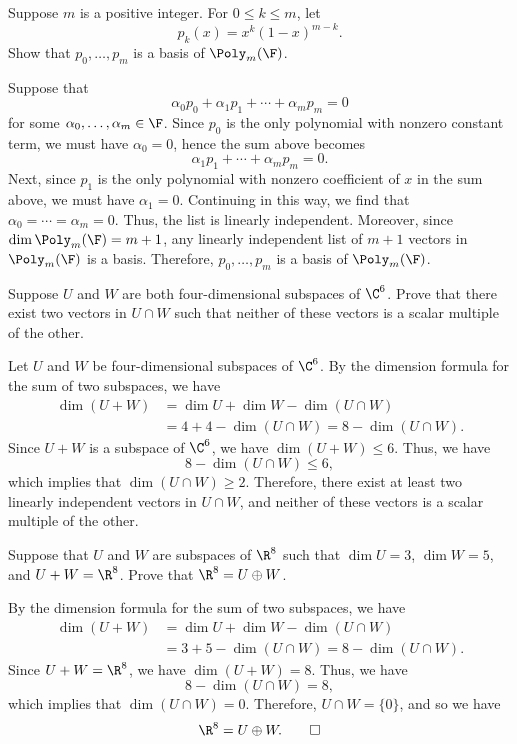 \begin{exercise}
Suppose $m$ is a positive integer. For $0\le k\le m$, let
\[ p_k(x) = x^k(1-x)^{m-k}. \]
Show that $p_0,\dots,p_m$ is a basis of $\Poly_m(\F)$.
\end{exercise}
\begin{solution}
Suppose that
\[ \alpha_0p_0+\alpha_1p_1+\cdots+\alpha_mp_m = 0 \]
for some $\alpha_0,\dots,\alpha_m\in\F$. Since $p_0$ is the only polynomial with
nonzero constant term, we must have $\alpha_0=0$, hence the sum above becomes
\[ \alpha_1p_1+\cdots+\alpha_mp_m = 0. \]
Next, since $p_1$ is the only polynomial with nonzero coefficient of $x$ in the
sum above, we must have $\alpha_1=0$. Continuing in this way, we find that
$\alpha_0=\cdots=\alpha_m=0$. Thus, the list is linearly independent. Moreover,
since $\dim\Poly_m(\F)=m+1$, any linearly independent list of $m+1$ vectors in
$\Poly_m(\F)$ is a basis. Therefore, $p_0,\dots,p_m$ is a basis of
$\Poly_m(\F)$.
\end{solution}

\begin{exercise}
Suppose $U$ and $W$ are both four-dimensional subspaces of $\C^6$. Prove that
there exist two vectors in $U\cap W$ such that neither of these vectors is a
scalar multiple of the other.
\end{exercise}
\begin{solution}
Let $U$ and $W$ be four-dimensional subspaces of $\C^6$. By the dimension
formula for the sum of two subspaces, we have
\begin{align*}
\dim(U+W) &= \dim U+\dim W-\dim(U\cap W)\\
  &= 4+4-\dim(U\cap W) = 8-\dim(U\cap W).
\end{align*}
Since $U+W$ is a subspace of $\C^6$, we have $\dim(U+W)\le6$. Thus, we have
\[ 8-\dim(U\cap W) \le 6, \]
which implies that $\dim(U\cap W)\ge2$. Therefore, there exist at least two
linearly independent vectors in $U\cap W$, and neither of these vectors is a
scalar multiple of the other.
\end{solution}

\begin{exercise}
Suppose that $U$ and $W$ are subspaces of $\R^8$ such that $\dim U=3$,
$\dim W=5$, and $U+W=\R^8$. Prove that $\R^8=U\oplus W$.
\end{exercise}
\begin{solution}
By the dimension formula for the sum of two subspaces, we have
\begin{align*}
\dim(U+W) &= \dim U+\dim W-\dim(U\cap W)\\
  &= 3+5-\dim(U\cap W) = 8-\dim(U\cap W).
\end{align*}
Since $U+W=\R^8$, we have $\dim(U+W)=8$. Thus, we have
\[ 8-\dim(U\cap W) = 8, \]
which implies that $\dim(U\cap W)=0$. Therefore, $U\cap W=\{0\}$, and so we
have
\[ \R^8 = U\oplus W. \qedhere \]
\end{solution}


